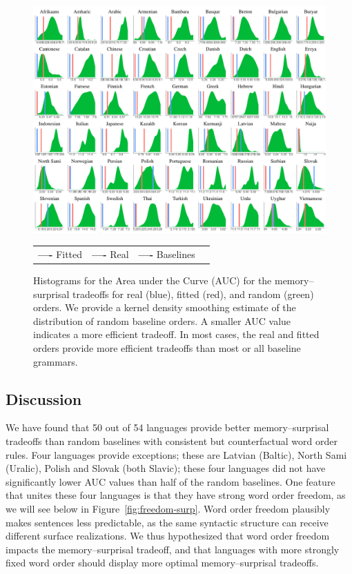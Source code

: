 \begin{figure}
	\begin{center}
\includegraphics[width=\textwidth]{auc-table_MLE.pdf}
\end{center}

\begin{center}
\begin{tabular}{llll}
\textbf{\textcolor{fitted}{----}} Fitted&
\textbf{\textcolor{real}{----}} Real&
\textbf{\textcolor{baseline}{----}} Baselines&
\end{tabular}
\end{center}
\caption{Histograms for the Area under the Curve (AUC) for the memory--surprisal tradeoffs for real (blue), fitted (red), and random (green) orders.
We provide a kernel density smoothing estimate of the distribution of random baseline orders.
A smaller AUC value indicates a more efficient tradeoff.
In most cases, the real and fitted orders provide more efficient tradeoffs than most or all baseline grammars.
}\label{fig:auc}
\end{figure}




\subsection{Discussion}\label{subsec:expt2-discussion}

We have found that 50 out of 54 languages provide better memory--surprisal tradeoffs than random baselines with consistent but counterfactual word order rules.
Four languages provide exceptions; these are Latvian (Baltic), North Sami (Uralic), Polish and Slovak (both Slavic); these four languages did not have significantly lower AUC values than half of the random baselines.
One feature that unites these four languages is that they have strong word order freedom, as we will see below in Figure~\ref{fig:freedom-surp}. %
Word order freedom plausibly makes sentences less predictable, as the same syntactic structure can receive different surface realizations.
We thus hypothesized that word order freedom  impacts the memory--surprisal tradeoff, and that languages with more strongly fixed word order should display more optimal memory--surprisal tradeoffs.


